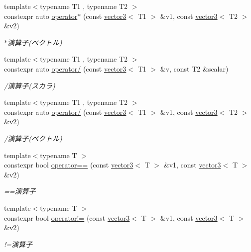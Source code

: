 \begin{DoxyCompactItemize}
{\footnotesize template$<$typename T1 , typename T2 $>$ }\\constexpr auto \mbox{\hyperlink{namespacesaki_a59d261ceb3780fa55acc164671b67992}{operator$\ast$}} (const \mbox{\hyperlink{classsaki_1_1vector3}{vector3}}$<$ T1 $>$ \&v1, const \mbox{\hyperlink{classsaki_1_1vector3}{vector3}}$<$ T2 $>$ \&v2)
\begin{DoxyCompactList}\small\item\em $\ast$演算子(ベクトル) \end{DoxyCompactList}\item 
{\footnotesize template$<$typename T1 , typename T2 $>$ }\\constexpr auto \mbox{\hyperlink{namespacesaki_a15270d7bd5638726debe317a16a6b26b}{operator/}} (const \mbox{\hyperlink{classsaki_1_1vector3}{vector3}}$<$ T1 $>$ \&v, const T2 \&scalar)
\begin{DoxyCompactList}\small\item\em /演算子(スカラ) \end{DoxyCompactList}\item 
{\footnotesize template$<$typename T1 , typename T2 $>$ }\\constexpr auto \mbox{\hyperlink{namespacesaki_aee335c88f00f71e52e37fd4bfb77b181}{operator/}} (const \mbox{\hyperlink{classsaki_1_1vector3}{vector3}}$<$ T1 $>$ \&v1, const \mbox{\hyperlink{classsaki_1_1vector3}{vector3}}$<$ T2 $>$ \&v2)
\begin{DoxyCompactList}\small\item\em /演算子(ベクトル) \end{DoxyCompactList}\item 
{\footnotesize template$<$typename T $>$ }\\constexpr bool \mbox{\hyperlink{namespacesaki_a3ce1faca02399d52a09851a1b6e8afe3}{operator==}} (const \mbox{\hyperlink{classsaki_1_1vector3}{vector3}}$<$ T $>$ \&v1, const \mbox{\hyperlink{classsaki_1_1vector3}{vector3}}$<$ T $>$ \&v2)
\begin{DoxyCompactList}\small\item\em ==演算子 \end{DoxyCompactList}\item 
{\footnotesize template$<$typename T $>$ }\\constexpr bool \mbox{\hyperlink{namespacesaki_aa8b0dcab7f268e88f01c92c95cd12135}{operator!=}} (const \mbox{\hyperlink{classsaki_1_1vector3}{vector3}}$<$ T $>$ \&v1, const \mbox{\hyperlink{classsaki_1_1vector3}{vector3}}$<$ T $>$ \&v2)
\begin{DoxyCompactList}\small\item\em !=演算子 \end{DoxyCompactList}\item 

\end{DoxyCompactItemize}
